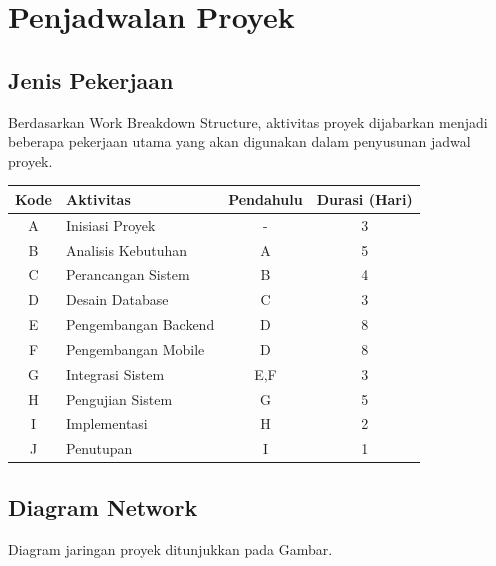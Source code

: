 \documentclass[12pt,a4paper]{article}
\begin{document}

\section{Penjadwalan Proyek}

\subsection{Jenis Pekerjaan}

Berdasarkan Work Breakdown Structure, aktivitas proyek dijabarkan menjadi beberapa pekerjaan utama yang akan digunakan dalam penyusunan jadwal proyek.

\begin{table}[H]
\centering
\begin{tabular}{cp{6cm}cc}
\toprule
\textbf{Kode} & \textbf{Aktivitas} & \textbf{Pendahulu} & \textbf{Durasi (Hari)} \\
\midrule
A & Inisiasi Proyek & - & 3 \\
B & Analisis Kebutuhan & A & 5 \\
C & Perancangan Sistem & B & 4 \\
D & Desain Database & C & 3 \\
E & Pengembangan Backend & D & 8 \\
F & Pengembangan Mobile & D & 8 \\
G & Integrasi Sistem & E,F & 3 \\
H & Pengujian Sistem & G & 5 \\
I & Implementasi & H & 2 \\
J & Penutupan & I & 1 \\
\bottomrule
\end{tabular}
\end{table}

\newpage    
\subsection{Diagram Network}

Diagram jaringan proyek ditunjukkan pada Gambar.
\end{document}
